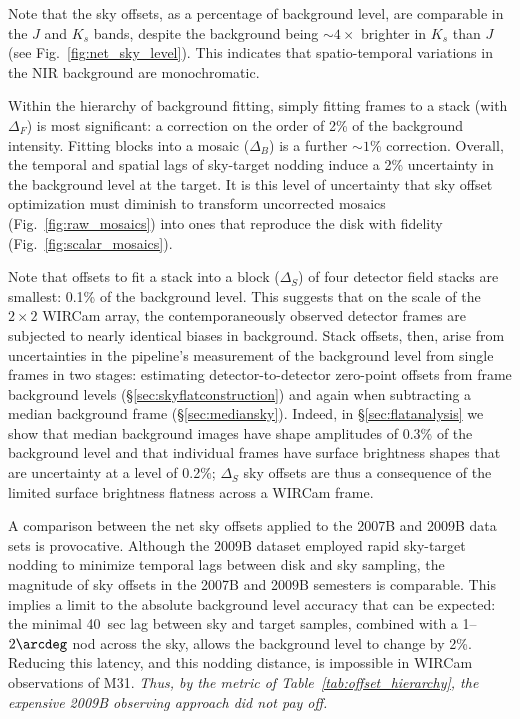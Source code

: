 \documentclass[iop]{emulateapj}
\newcommand{\Fig}[1]{Fig.~\ref{fig:#1}}  %
\newcommand{\Tab}[1]{Table~\ref{tab:#1}}  %
\newcommand{\Sec}[1]{\S\ref{sec:#1}}  %
\begin{document}

Note that the sky offsets, as a percentage of background level, are comparable in the $J$ and $K_s$ bands, despite the background being $\sim 4\times$ brighter in $K_s$ than $J$ (see \Fig{net_sky_level}).
This indicates that spatio-temporal variations in the NIR background are monochromatic.

Within the hierarchy of background fitting, simply fitting frames to a stack (with $\Delta_F$) is most significant: a correction on the order of 2\% of the background intensity.
Fitting blocks into a mosaic ($\Delta_B$) is a further $\sim 1$\% correction.
Overall, the temporal and spatial lags of sky-target nodding induce a 2\% uncertainty in the background level at the target.
It is this level of uncertainty that sky offset optimization must diminish to transform uncorrected mosaics (\Fig{raw_mosaics}) into ones that reproduce the disk with fidelity (\Fig{scalar_mosaics}).

Note that offsets to fit a stack into a block ($\Delta_S$) of four detector field stacks are smallest: 0.1\% of the background level.
This suggests that on the scale of the $2\times 2$ WIRCam array, the contemporaneously observed detector frames are subjected to nearly identical biases in background.
Stack offsets, then, arise from uncertainties in the pipeline's measurement of the background level from single frames in two stages: estimating detector-to-detector zero-point offsets from frame background levels (\Sec{skyflatconstruction}) and again when subtracting a median background frame (\Sec{mediansky}).
Indeed, in \Sec{flatanalysis} we show that median background images have shape amplitudes of 0.3\% of the background level and that individual frames have surface brightness shapes that are uncertainty at a level of 0.2\%; $\Delta_S$ sky offsets are thus a consequence of the limited surface brightness flatness across a WIRCam frame.

A comparison between the net sky offsets applied to the 2007B and 2009B data sets is provocative.
Although the 2009B dataset employed rapid sky-target nodding to minimize temporal lags between disk and sky sampling, the magnitude of sky offsets in the 2007B and 2009B semesters is comparable.
This implies a limit to the absolute background level accuracy that can be expected: the minimal 40~sec lag between sky and target samples, combined with a 1--$2\arcdeg$ nod across the sky, allows the background level to change by 2\%.
Reducing this latency, and this nodding distance, is impossible in WIRCam observations of M31.
\emph{Thus, by the metric of \Tab{offset_hierarchy}, the expensive 2009B observing approach did not pay off.}
\end{document}
